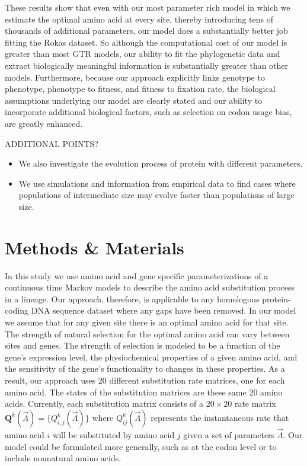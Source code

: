 \documentclass[13pt]{article}
\newcommand{\Qmat}{\ensuremath{\mathbf{Q}}\xspace}
\begin{document}
These results show that even with our most parameter rich model in which we estimate the optimal amino acid at every site, thereby introducing tens of thousands of additional parameters, our model does a substantially better job fitting the Rokas dataset.
So although the computational cost of our model is greater than most GTR models,  our ability to fit the phylogenetic data and extract biologically meaningful information is substantially greater than other models.
Furthermore, because our approach explicitly links genotype to phenotype, phenotype to fitness, and fitness to fixation rate, the biological assumptions underlying our model are clearly stated and our ability to incorporate additional biological factors, such as selection on codon usage bias, are greatly enhanced.
 
ADDITIONAL POINTS?
\begin{itemize}
\item We also investigate the evolution process of protein with different parameters.
\item We use simulations and information from empirical data to find cases where populations of intermediate size may evolve faster than populations of large size.
\end{itemize}


\section{Methods \& Materials}
In this study we use amino acid and gene specific parameterizations of a continuous time Markov models to describe the amino acid substitution process in a lineage.
Our approach, therefore, is applicable to any homologous protein-coding DNA sequence dataset where any gaps have been removed.
In our model we assume that for any given site there is an optimal amino acid for that site.
The strength of natural selection for the optimal amino acid can vary between sites and genes.
The strength of selection is modeled to be a function of the gene's expression level, the physiochemical properties of a given amino acid, and the sensitivity of the gene's functionality to changes in these properties.
As a result, our approach uses 20 different substitution rate matrices, one for each amino acid. 
The states of the substitution matrices are these same 20 amino acids.
Currently, each substitution matrix consists of a  $20 \times 20$ rate matrix $\Qmat^k(\vec{\Lambda})=\{Q^k_{i,j}(\vec{\Lambda})\}$ where $Q^k_{ij}(\vec{\Lambda})$ represents the instantaneous rate that amino acid $i$ will be substituted by amino acid $j$ given a set of parameters $\vec{\Lambda}$.
Our model could be formulated more generally, such as at the codon level or to include nonnatural amino acids.
\end{document}

